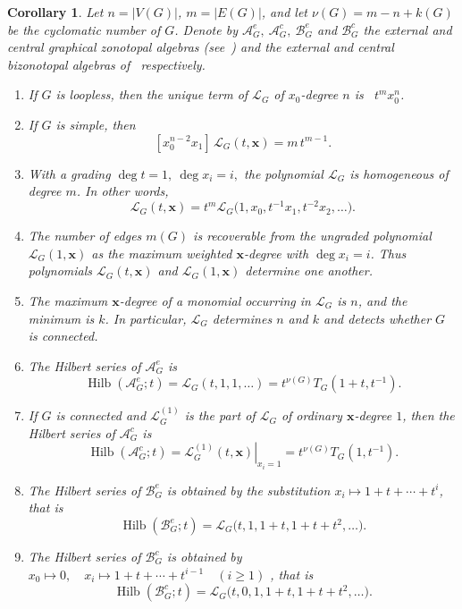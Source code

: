 \documentclass[11pt]{article}
\theoremstyle{plain}
\newtheorem{corollary}[theorem]{Corollary}
\theoremstyle{definition}
\renewcommand{\mathcal}{\mathscr}
\newcommand{\LL}{\mathcal{L}}    %
\newcommand{\BZ}{\mathcal{B}}    %
\newcommand{\cA}{\mathcal{A}}    %
\newcommand{\bx}{\mathbf{x}}
\newcommand{\Hil}{\operatorname{Hilb}}
\numberwithin{equation}{section}
\begin{document}
\begin{corollary}\label{th:cor}
  Let $n=|V(G)|$, $m=|E(G)|$, and
let $ \nu(G)=m-n+k(G)$ be the cyclomatic number of $G$.
Denote by $\cA_G^e, \ \cA_G^c, \ \BZ_G^e$ and $\BZ_G^c$  the external and central graphical zonotopal algebras (see~\cite{PS,HR}) and
the external and central bizonotopal algebras of~\cite{KNSV} respectively.
\begin{enumerate}[(1)]
\item If $G$ is loopless, then the unique term of $\LL_G$ of $x_0$-degree $n$ is \   $ t^m x_0^n$.

\item If $G$ is simple, then
\[
   [x_0^{n-2}x_1]\,\LL_G(t,\bx)=m\,t^{m-1}.
\]

\item With a grading
  $ \deg t=1, \ \deg x_i=i,$
the polynomial $\LL_G$ is homogeneous of degree $m$.  In other words,
\begin{equation}\label{eq:scaling-L}
   \LL_G(t,\bx)  =
  t^m\LL_G\bigl(1,x_0,t^{-1}x_1,t^{-2}x_2,\ldots\bigr).
\end{equation}

\item The number of edges $m(G)$ is recoverable from the ungraded polynomial
  $\LL_G(1,\bx)$  as
the maximum weighted $\bx$-degree with $\deg x_i=i$.  Thus polynomials  $\LL_G(t,\bx)$ and $\LL_G(1,\bx)$ determine one another.

\item The maximum  $\bx$-degree of a monomial occurring in $\LL_G$ is $n$, and the minimum is $k$.
 In particular, $\LL_G$ determines $n$ and $k$ and detects whether $G$ is connected.

\item The Hilbert series of $\cA_G^e$ is
\[
 \Hil(\cA_G^e;t)  = \LL_G(t,1,1,\ldots)  =
 t^{\nu(G)}T_G(1+t,t^{-1}).
\]

\item If $G$ is connected and $\LL_G^{(1)}$ is the part of $\LL_G$ of ordinary $\bx$-degree $1$,
  then the Hilbert series of $\cA_G^c$ is
\[
 \Hil(\cA_G^c;t)
 =
 \left.\LL_G^{(1)}(t,\bx)\right|_{x_i=1}
 =
 t^{\nu(G)}T_G(1,t^{-1}).
\]

\item The Hilbert series of $\BZ_G^e$ is obtained by the substitution $x_i\longmapsto 1+t+\cdots+t^i$, that is \begin{equation}\label{eq:external-biz-specialization}
 \Hil(\BZ_G^e;t)
 =
 \LL_G\bigl(t,1,1+t,1+t+t^2,\ldots\bigr).
\end{equation}

\item The Hilbert series of $\BZ_G^c$ is obtained by
\   $  x_0\longmapsto0, \quad
  x_i\longmapsto1+t+\cdots+t^{i-1} \quad(i\ge 1)
$
, that is
\begin{equation}\label{eq:central-biz-specialization}
 \Hil(\BZ_G^c;t)
 =
 \LL_G\bigl(t,0,1,1+t,1+t+t^2,\ldots\bigr).
\end{equation}
\end{enumerate}
\end{corollary}
\end{document}
